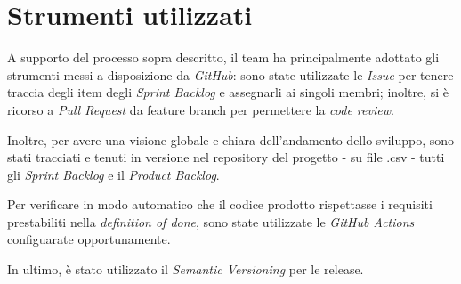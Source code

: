 \section{Strumenti utilizzati}\label{sec:strumenti-utilizzati}
A supporto del processo sopra descritto, il team ha principalmente adottato gli strumenti messi a disposizione da \textit{GitHub}: sono state utilizzate le \textit{Issue} per
tenere traccia degli item degli \textit{Sprint Backlog} e assegnarli ai singoli membri;
inoltre, si è ricorso a \textit{Pull Request} da feature branch per permettere la \textit{code review}.

Inoltre, per avere una visione globale e chiara dell'andamento dello sviluppo, sono stati tracciati e tenuti in versione nel repository del progetto - su file .csv - tutti gli \textit{Sprint Backlog} e il \textit{Product Backlog}.

Per verificare in modo automatico che il codice prodotto rispettasse i requisiti prestabiliti nella \textit{definition of done}, sono state utilizzate le \textit{GitHub Actions} configuarate opportunamente.

In ultimo, è stato utilizzato il \textit{Semantic Versioning}  per le release.
